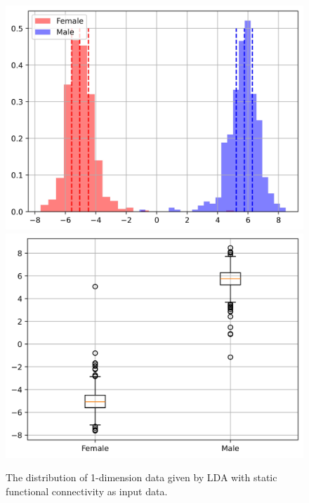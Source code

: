 \documentclass[11pt]{article}
\begin{document}
\begin{figure}[H]
{\begin{minipage}[b]{0.3\textwidth}
            \includegraphics[width=1\textwidth]{../Analysis/LDA/node=50_size=4800_step=4800_rho=0.1/hist_0.jpg}
            \includegraphics[width=1\textwidth]{../Analysis/LDA/node=50_size=4800_step=4800_rho=0.1/box_0.jpg}
        \end{minipage}
    }
    \caption{The distribution of 1-dimension data given by LDA with static functional connectivity as input data.}
    \label{LDA-example-sfc}
\end{figure}
\end{document}

